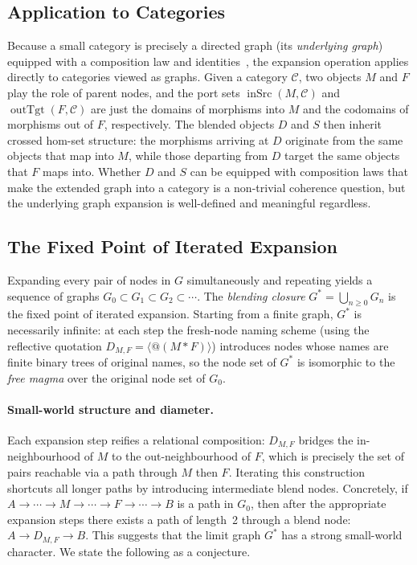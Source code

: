 \documentclass[11pt, a4paper]{article}
\theoremstyle{definition}
\theoremstyle{plain}
\theoremstyle{remark}
\newcommand{\inSrc}{\operatorname{inSrc}}
\newcommand{\outTgt}{\operatorname{outTgt}}
\newcommand{\tensor}{\mathbin{*}}
\begin{document}
\subsection*{Application to Categories}

Because a small category is precisely a directed graph (its \emph{underlying
graph}) equipped with a composition law and identities~\cite{maclane1998}, the
expansion operation applies directly to categories viewed as graphs.  Given a
category $\mathcal{C}$, two objects $M$ and $F$ play the role of parent nodes,
and the port sets $\inSrc(M, \mathcal{C})$ and $\outTgt(F, \mathcal{C})$ are
just the domains of morphisms into $M$ and the codomains of morphisms out of
$F$, respectively.  The blended objects $D$ and $S$ then inherit crossed
hom-set structure: the morphisms arriving at $D$ originate from the same
objects that map into $M$, while those departing from $D$ target the same
objects that $F$ maps into.  Whether $D$ and $S$ can be equipped with
composition laws that make the extended graph into a category is a non-trivial
coherence question, but the underlying graph expansion is well-defined and
meaningful regardless.

\subsection*{The Fixed Point of Iterated Expansion}

Expanding every pair of nodes in $G$ simultaneously and repeating yields a
sequence of graphs $G_0 \subset G_1 \subset G_2 \subset \cdots$.  The
\emph{blending closure} $G^* = \bigcup_{n \geq 0} G_n$ is the fixed point of
iterated expansion.  Starting from a finite graph, $G^*$ is necessarily
infinite: at each step the fresh-node naming scheme (using the reflective
quotation $D_{M,F} = \langle @(M \tensor F) \rangle$) introduces nodes whose
names are finite binary trees of original names, so the node set of $G^*$ is
isomorphic to the \emph{free magma} over the original node set of $G_0$.

\paragraph{Small-world structure and diameter.}

Each expansion step reifies a relational composition: $D_{M,F}$ bridges the
in-neighbourhood of $M$ to the out-neighbourhood of $F$, which is precisely
the set of pairs reachable via a path through $M$ then $F$.  Iterating this
construction shortcuts all longer paths by introducing intermediate blend
nodes.  Concretely, if $A \to \cdots \to M \to \cdots \to F \to \cdots \to B$
is a path in $G_0$, then after the appropriate expansion steps there exists a
path of length~2 through a blend node: $A \to D_{M,F} \to B$.  This suggests
that the limit graph $G^*$ has a strong small-world character.  We state the
following as a conjecture.
\end{document}
